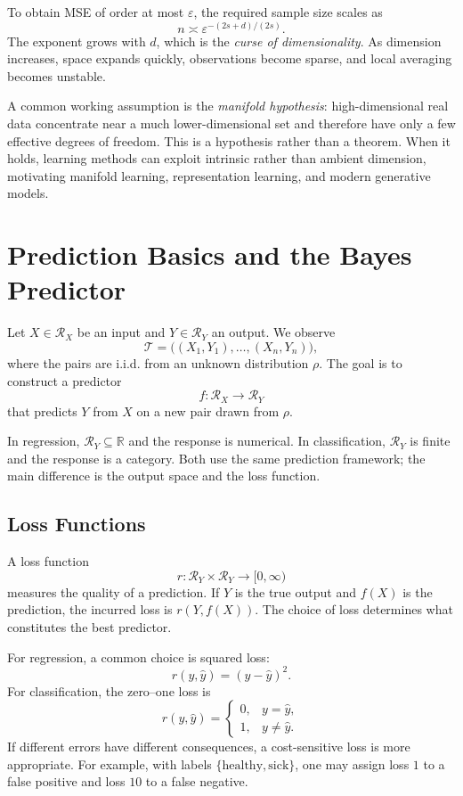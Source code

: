 \documentclass[12pt,oneside]{book}
\numberwithin{equation}{section}
\theoremstyle{definition}
\theoremstyle{plain}
\theoremstyle{remark}
\newcommand{\R}{\mathbb{R}}
\begin{document}
To obtain MSE of order at most $\varepsilon$, the required sample size scales as
\[
n\asymp\varepsilon^{-(2s+d)/(2s)}.
\]
The exponent grows with $d$, which is the \emph{curse of dimensionality}. As dimension increases, space expands quickly, observations become sparse, and local averaging becomes unstable.

A common working assumption is the \emph{manifold hypothesis}: high-dimensional real data concentrate near a much lower-dimensional set and therefore have only a few effective degrees of freedom. This is a hypothesis rather than a theorem. When it holds, learning methods can exploit intrinsic rather than ambient dimension, motivating manifold learning, representation learning, and modern generative models.

\section{Prediction Basics and the Bayes Predictor}
Let $X\in\mathcal{R}_X$ be an input and $Y\in\mathcal{R}_Y$ an output. We observe
\[
\mathcal{T}=\bigl((X_1,Y_1),\ldots,(X_n,Y_n)\bigr),
\]
where the pairs are i.i.d. from an unknown distribution $\rho$. The goal is to construct a predictor
\[
f\colon\mathcal{R}_X\to\mathcal{R}_Y
\]
that predicts $Y$ from $X$ on a new pair drawn from $\rho$.

In regression, $\mathcal{R}_Y\subseteq\R$ and the response is numerical. In classification, $\mathcal{R}_Y$ is finite and the response is a category. Both use the same prediction framework; the main difference is the output space and the loss function.

\subsection{Loss Functions}
A loss function
\[
r\colon\mathcal{R}_Y\times\mathcal{R}_Y\to[0,\infty)
\]
measures the quality of a prediction. If $Y$ is the true output and $f(X)$ is the prediction, the incurred loss is $r(Y,f(X))$. The choice of loss determines what constitutes the best predictor.

For regression, a common choice is squared loss:
\[
r(y,\widehat y)=(y-\widehat y)^2.
\]
For classification, the zero--one loss is
\[
r(y,\widehat y)=
\begin{cases}
0, & y=\widehat y,\\
1, & y\neq\widehat y.
\end{cases}
\]
If different errors have different consequences, a cost-sensitive loss is more appropriate. For example, with labels $\{\text{healthy},\text{sick}\}$, one may assign loss $1$ to a false positive and loss $10$ to a false negative.
\end{document}
